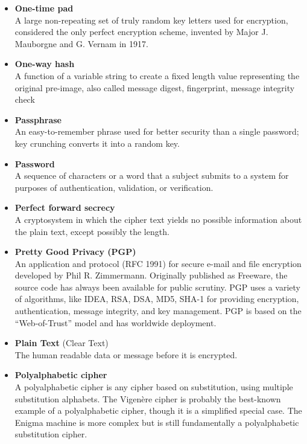 \begin{itemize}
\item \textbf{One-time pad}\\
A large non-repeating set of truly random key letters used for encryption, considered the only perfect encryption scheme, invented by Major J. Mauborgne and G. Vernam in 1917.

\item \textbf{One-way hash}\\
A function of a variable string to create a fixed length value representing the original pre-image, also called message digest, fingerprint, message integrity check

\item \textbf{Passphrase}\\
An easy-to-remember phrase used for better security than a single password; key
crunching converts it into a random key.

\item \textbf{Password}\\
A sequence of characters or a word that a subject submits to a system for purposes of authentication, validation, or verification.

\item \textbf{Perfect forward secrecy}\\
A cryptosystem in which the cipher text yields no possible information about the plain text, except possibly the length.

\item \textbf{Pretty Good Privacy (PGP)}\\
An application and protocol (RFC 1991) for secure e-mail and file encryption developed by Phil R. Zimmermann. Originally published as Freeware, the source code has always been available for public scrutiny. PGP uses a variety of algorithms, like IDEA, RSA, DSA, MD5, SHA-1 for providing encryption, authentication, message integrity, and key management. PGP is based on the “Web-of-Trust” model and has worldwide deployment.

\item \textbf{Plain Text} (Clear Text)\\
The human readable data or message before it is encrypted.

\item \textbf{Polyalphabetic cipher}\\
A polyalphabetic cipher is any cipher based on substitution, using multiple substitution alphabets. The Vigenère cipher is probably the best-known example of a polyalphabetic cipher, though it is a simplified special case. The Enigma machine is more complex but is still fundamentally a polyalphabetic substitution cipher.


\end{itemize}
